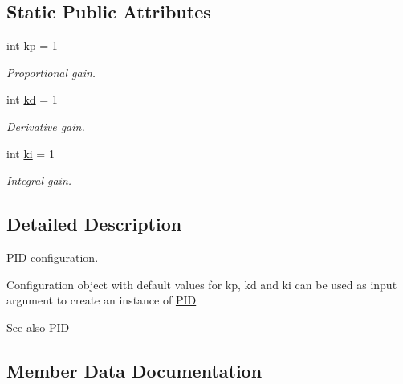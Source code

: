 \subsection*{Static Public Attributes}
\begin{DoxyCompactItemize}
\item 
int \hyperlink{classci__example__python_1_1pid_1_1DefaultConfiguration_a8cda5972b7f42321a1100e636449edc0}{kp} = 1
\begin{DoxyCompactList}\small\item\em Proportional gain. \end{DoxyCompactList}\item 
int \hyperlink{classci__example__python_1_1pid_1_1DefaultConfiguration_a55077386d5f7c1fc5a24c6e0749b7678}{kd} = 1
\begin{DoxyCompactList}\small\item\em Derivative gain. \end{DoxyCompactList}\item 
int \hyperlink{classci__example__python_1_1pid_1_1DefaultConfiguration_ab390c7d434abe3ac47bff24d576f23d2}{ki} = 1
\begin{DoxyCompactList}\small\item\em Integral gain. \end{DoxyCompactList}\end{DoxyCompactItemize}


\subsection{Detailed Description}
\hyperlink{classci__example__python_1_1pid_1_1PID}{P\+ID} configuration. 

Configuration object with default values for kp, kd and ki can be used as input argument to create an instance of \hyperlink{classci__example__python_1_1pid_1_1PID}{P\+ID} \begin{DoxySeeAlso}{See also}
\hyperlink{classci__example__python_1_1pid_1_1PID}{P\+ID} 
\end{DoxySeeAlso}


\subsection{Member Data Documentation}
\mbox{\label{classci__example__python_1_1pid_1_1DefaultConfiguration_a55077386d5f7c1fc5a24c6e0749b7678}} 
